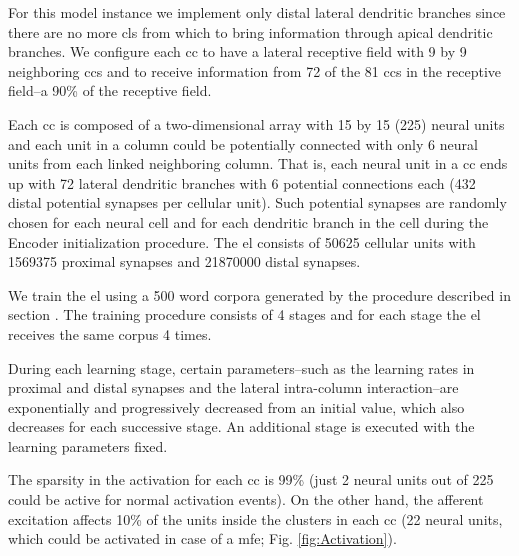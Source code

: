 \documentclass[10pt,letterpaper]{article}
\begin{document}
For this model instance we implement only distal lateral dendritic branches since there are
no more \glspl{cl} from which to bring information through apical dendritic branches.
We configure each \gls{cc} to have a lateral receptive field with 9 by 9 neighboring \glspl{cc}
and to receive information from 72 of the 81 \glspl{cc} in the receptive field--a 90\% of the receptive field.

Each \gls{cc} is composed of a two-dimensional array with 15 by 15 (225) neural units and
each unit in a column could be potentially connected with only 6 neural units from each linked neighboring column. 
That is, each neural unit in a \gls{cc} ends up with 72 lateral dendritic branches with 6 potential connections each
(432 distal potential synapses per cellular unit).
Such potential synapses are randomly chosen for each neural cell and for each dendritic branch in the cell during the Encoder initialization procedure.
The \gls{el} consists of 50625 cellular units with 1569375 proximal synapses and 21870000 distal synapses.

We train the \gls{el} using a 500 word corpora generated by the procedure described in section .
The training procedure consists of 4 stages and for each stage the \gls{el} receives the same corpus 4 times.

During each learning stage, certain parameters--such as the learning rates in proximal and distal synapses and the lateral
intra-column interaction--are exponentially and progressively decreased from an initial value, which also decreases
for each successive stage.
An additional stage is executed with the learning parameters fixed.

The sparsity in the activation for each \gls{cc} is 99\% (just 2 neural units out of 225 could be active for normal activation events).
On the other hand, the afferent excitation affects 10\% of the units inside the clusters in each \gls{cc}
(22 neural units, which could be activated in case of a \gls{mfe}; Fig. \ref{fig:Activation}).









~\\
~\\
~\\

\end{document}
